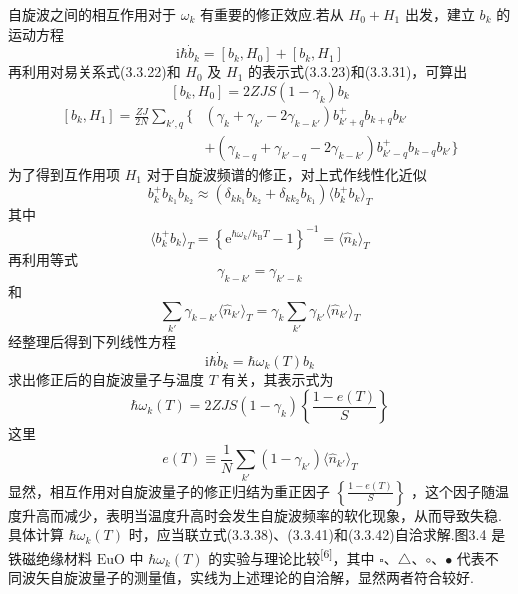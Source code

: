 自旋波之间的相互作用对于 $\omega_k$ 有重要的修正效应.若从 $H_0+H_1$ 出发，建立 $b_k$ 的运动方程
\begin{equation}
  \mathrm{i}\hbar\dot{b}_k=\left[b_k,H_0\right]+\left[b_k,H_1\right]
\end{equation}
再利用对易关系式(3.3.22)和 $H_0$ 及 $H_1$ 的表示式(3.3.23)和(3.3.31)，可算出
\begin{equation}
  \left[b_k,H_0\right]=2ZJS\left(1-\gamma_k\right)b_k
\end{equation}
\begin{equation}
\begin{aligned}
  \left[b_k,H_1\right]=\frac{ZJ}{2N}\sum_{k',q}\biggl\{&\left(\gamma_k+\gamma_{k'}-2\gamma_{k-k'}\right)
  b_{k'+q}^{+}b_{k+q}b_{k'}\\
  &+\left(\gamma_{k-q}+\gamma_{k'-q}-2\gamma_{k-k'}\right)b_{k'-q}^{+}b_{k-q}b_{k'}\biggr\}
\end{aligned}
\end{equation}
为了得到互作用项 $H_1$ 对于自旋波频谱的修正，对上式作线性化近似
\begin{equation}
  b_k^{+}b_{k_1}b_{k_2}\approx\left(\delta_{kk_1}b_{k_2}+\delta_{kk_2}b_{k_1}\right)\langle b_k^{+}b_k\rangle_T
\end{equation}
其中
\begin{equation}
  \langle b_k^{+}b_k\rangle_T=\left\{\mathrm{e}^{\hbar\omega_k/k_{\mathrm{B}}T}-1\right\}^{-1}
  =\langle\hat{n}_k\rangle_T
\end{equation}
再利用等式
\begin{equation*}
  \gamma_{k-k'}=\gamma_{k'-k}
\end{equation*}
和
\begin{equation}
  \sum_{k'}\gamma_{k-k'}\langle\hat{n}_{k'}\rangle_T=\gamma_k\sum_{k'}\gamma_{k'}\langle\hat{n}_{k'}\rangle_T
\end{equation}
经整理后得到下列线性方程
\begin{equation}
  \mathrm{i}\hbar\dot{b}_k=\hbar\omega_k\left(T\right)b_k
\end{equation}
求出修正后的自旋波量子与温度 $T$ 有关，其表示式为
\begin{equation}
  \hbar\omega_k\left(T\right)=2ZJS\left(1-\gamma_k\right)\left\{\frac{1-e\left(T\right)}{S}\right\}
\end{equation}
这里
\begin{equation}
  e\left(T\right)\equiv\frac{1}{N}\sum_{k'}\left(1-\gamma_{k'}\right)\langle\hat{n}_{k'}\rangle_T
\end{equation}
显然，相互作用对自旋波量子的修正归结为重正因子 $\left\{\frac{1-e\left(T\right)}{S}\right\}$
，这个因子随温度升高而减少，表明当温度升高时会发生自旋波频率的软化现象，从而导致失稳.具体计算
$\hbar\omega_k\left(T\right)$
时，应当联立式(3.3.38)、(3.3.41)和(3.3.42)自洽求解.图3.4
是铁磁绝缘材料 $\mathrm{EuO}$ 中 $\hbar\omega_k\left(T\right)$
的实验与理论比较\textsuperscript{[6]}，其中 $\square$、$\triangle$、$\circ$、$\bullet$
代表不同波矢自旋波量子的测量值，实线为上述理论的自洽解，显然两者符合较好.

